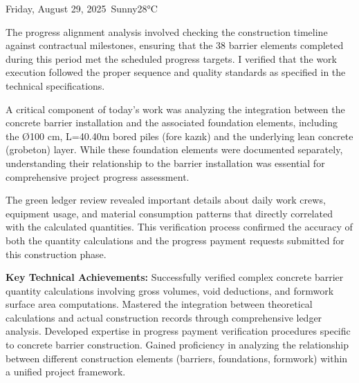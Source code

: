 \begin{dailyentry}{Friday, August 29, 2025}{\weathersunny\ Sunny}{28°C}
\begin{workcontent}
The progress alignment analysis involved checking the construction timeline against contractual milestones, ensuring that the 38 barrier elements completed during this period met the scheduled progress targets. I verified that the work execution followed the proper sequence and quality standards as specified in the technical specifications.

A critical component of today's work was analyzing the integration between the concrete barrier installation and the associated foundation elements, including the Ø100 cm, L=40.40m bored piles (fore kazık) and the underlying lean concrete (grobeton) layer. While these foundation elements were documented separately, understanding their relationship to the barrier installation was essential for comprehensive project progress assessment.

The green ledger review revealed important details about daily work crews, equipment usage, and material consumption patterns that directly correlated with the calculated quantities. This verification process confirmed the accuracy of both the quantity calculations and the progress payment requests submitted for this construction phase.

\textbf{Key Technical Achievements:} Successfully verified complex concrete barrier quantity calculations involving gross volumes, void deductions, and formwork surface area computations. Mastered the integration between theoretical calculations and actual construction records through comprehensive ledger analysis. Developed expertise in progress payment verification procedures specific to concrete barrier construction. Gained proficiency in analyzing the relationship between different construction elements (barriers, foundations, formwork) within a unified project framework.
\end{workcontent}


\end{dailyentry}
